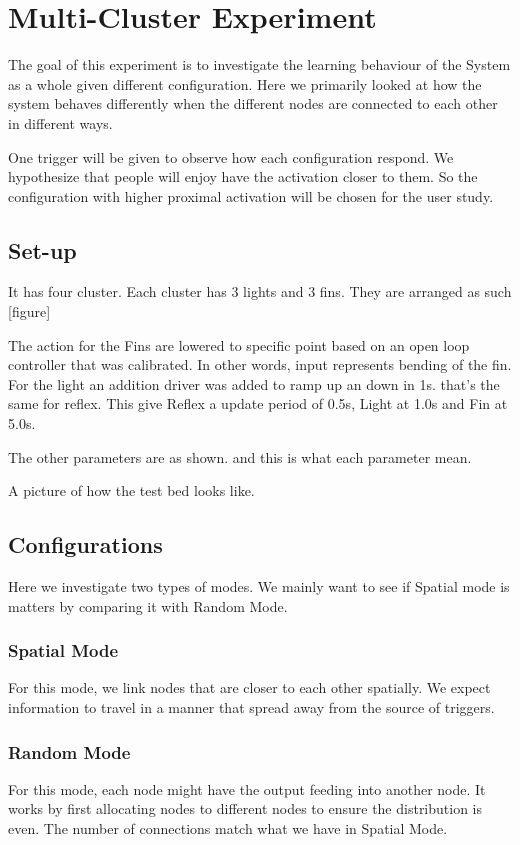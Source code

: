\section{Multi-Cluster Experiment}

The goal of this experiment is to investigate the learning behaviour of the System as a whole given different configuration. Here we primarily looked at how the system behaves differently when the different nodes are connected to each other in different ways. 

One trigger will be given to observe how each configuration respond. We hypothesize that people will enjoy have the activation closer to them. So the configuration with higher proximal activation will be chosen for the user study. 

\subsection{Set-up} \label{sec:multi-cluster-setup}

It has four cluster. Each cluster has 3 lights and 3 fins. 
They are arranged as such [figure]

The action for the Fins are lowered to specific point based on an open loop controller that was calibrated. In other words, input represents bending of the fin. For the light an addition driver was added to ramp up an down in 1s. that's the same for reflex. This give Reflex a update period of 0.5s, Light at 1.0s and Fin at 5.0s. 

The other parameters are as shown. and this is what each parameter mean.

A picture of how the test bed looks like. 

\subsection{Configurations}

Here we investigate two types of modes. We mainly want to see if Spatial mode is matters by comparing it with Random Mode. 

\subsubsection{Spatial Mode}
For this mode, we link nodes that are closer to each other spatially. We expect information to travel in a manner that spread away from the source of triggers. 

\subsubsection{Random Mode}
For this mode, each node might have the output feeding into another node. It works by first allocating nodes to different nodes to ensure the distribution is even. The number of connections match what we have in Spatial Mode.

